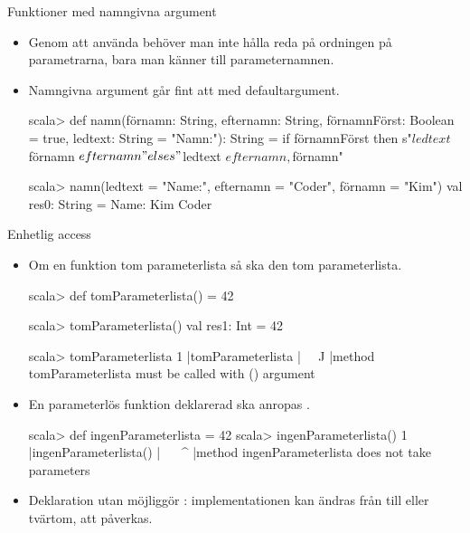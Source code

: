 \begin{Slide}{Funktioner med namngivna argument}
	\begin{itemize}
		\item Genom att använda  behöver man inte hålla reda på ordningen på parametrarna, bara man känner till parameternamnen.
		\item Namngivna argument går fint att  med defaultargument.
		      \begin{REPLnonum}[basicstyle=\SlideFontSize{7}{9}\ttfamily\color{white}]
			      scala> def namn(förnamn: String,
			      efternamn: String,
			      förnamnFörst: Boolean = true,
			      ledtext: String = "Namn:"): String =
			      if förnamnFörst then s"$ledtext $förnamn $efternamn"
				      else s"$ledtext $efternamn, $förnamn"

			      scala> namn(ledtext = "Name:", efternamn = "Coder", förnamn = "Kim")
			      val res0: String = Name: Kim Coder
		      \end{REPLnonum}
	\end{itemize}
\end{Slide}

\begin{Slide}{Enhetlig access}\SlideFontSmall
	\begin{itemize}
		\item Om en funktion   tom parameterlista \code{()} så ska den   tom parameterlista.
		      \begin{REPLsmall}
			      scala> def tomParameterlista() = 42

			      scala> tomParameterlista()
			      val res1: Int = 42

			      scala> tomParameterlista
			      1 |tomParameterlista
			      |^^^^^^^^^^^^^^^^^
			      |method tomParameterlista must be called with () argument
		      \end{REPLsmall}

		\item En parameterlös funktion deklarerad  \code{()} ska anropas  \code{()}.
		      \begin{REPLsmall}
			      scala> def ingenParameterlista = 42
			      scala> ingenParameterlista()
			      1 |ingenParameterlista()
			      |^^^^^^^^^^^^^^^^^^^
			      |method ingenParameterlista does not take parameters
		      \end{REPLsmall}

		\item Deklaration utan \code{()} möjliggör : implementationen kan ändras från  till  eller tvärtom,  att  påverkas.
		      \pause

	\end{itemize}
\end{Slide}

